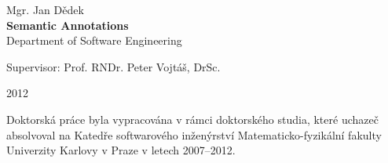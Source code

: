 \documentclass[12pt,a4paper,twoside,notitlepage]{article}
\newcommand{\TheTitle}{Semantic Annotations}
\newcommand{\TheAuthor}{Mgr. Jan D\v{e}dek}
\newcommand{\TheSupervisor}{Prof. RNDr. Peter Vojt\'{a}\v{s}, DrSc.}
\begin{document}
\begin{titlepage}
\begin{center}
{\Large \TheAuthor}\\ %
\vspace{5mm}
{\Large\bf \TheTitle} \\
\vspace{5mm}
Department of Software Engineering\\ %
\vspace{15mm}

{
\large
\noindent Supervisor: \TheSupervisor 
}
\vspace{1mm} 

\vspace{20mm}

2012 %
\end{center}

\end{titlepage} %


\normalsize %
\pagestyle{empty}
\setcounter{page}{2} %

\cleardoublepage

\noindent Doktorsk\'{a} pr\'{a}ce byla vypracov\'{a}na v r\'{a}mci doktorsk\'{e}ho studia, kter\'{e} ucha\-ze\v{c} absolvoval na Kated\v{r}e softwarov\'{e}ho in\v{z}en\'{y}rstv\'{i} Matematicko-fyzik\'{a}ln\'{i} fakulty Univerzity Karlovy v Praze v letech 2007--2012.

\vspace{5mm}
\end{document}
